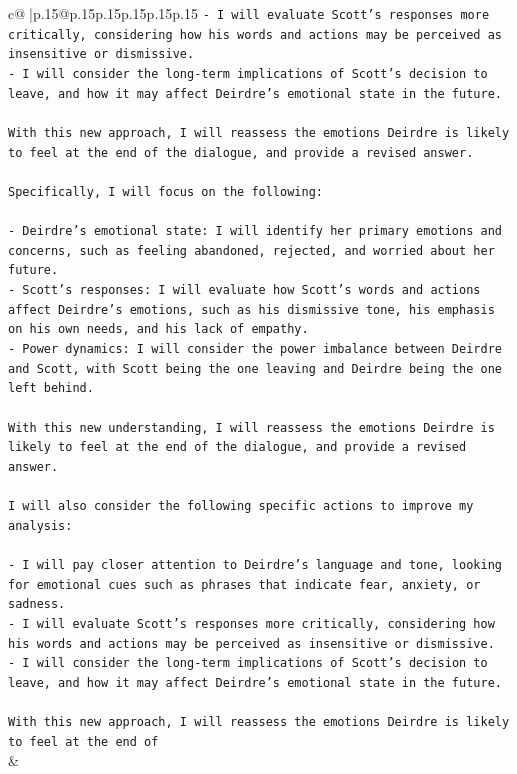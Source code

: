 \documentclass{article}
\begin{document}
{\begin{supertabular}{c@{$\;$}|p{.15\linewidth}@{}p{.15\linewidth}p{.15\linewidth}p{.15\linewidth}p{.15\linewidth}p{.15\linewidth}}
{{{\texttt{{-} I will evaluate Scott's responses more critically, considering how his words and actions may be perceived as insensitive or dismissive.} \\
\texttt{{-} I will consider the long{-}term implications of Scott's decision to leave, and how it may affect Deirdre's emotional state in the future.} \\
\\ 
\texttt{With this new approach, I will reassess the emotions Deirdre is likely to feel at the end of the dialogue, and provide a revised answer.} \\
\\ 
\texttt{Specifically, I will focus on the following:} \\
\\ 
\texttt{{-} Deirdre's emotional state: I will identify her primary emotions and concerns, such as feeling abandoned, rejected, and worried about her future.} \\
\texttt{{-} Scott's responses: I will evaluate how Scott's words and actions affect Deirdre's emotions, such as his dismissive tone, his emphasis on his own needs, and his lack of empathy.} \\
\texttt{{-} Power dynamics: I will consider the power imbalance between Deirdre and Scott, with Scott being the one leaving and Deirdre being the one left behind.} \\
\\ 
\texttt{With this new understanding, I will reassess the emotions Deirdre is likely to feel at the end of the dialogue, and provide a revised answer.} \\
\\ 
\texttt{I will also consider the following specific actions to improve my analysis:} \\
\\ 
\texttt{{-} I will pay closer attention to Deirdre's language and tone, looking for emotional cues such as phrases that indicate fear, anxiety, or sadness.} \\
\texttt{{-} I will evaluate Scott's responses more critically, considering how his words and actions may be perceived as insensitive or dismissive.} \\
\texttt{{-} I will consider the long{-}term implications of Scott's decision to leave, and how it may affect Deirdre's emotional state in the future.} \\
\\ 
\texttt{With this new approach, I will reassess the emotions Deirdre is likely to feel at the end of} \\
            }
        }
    }
    & \\ \\

\end{supertabular}
}
\end{document}
